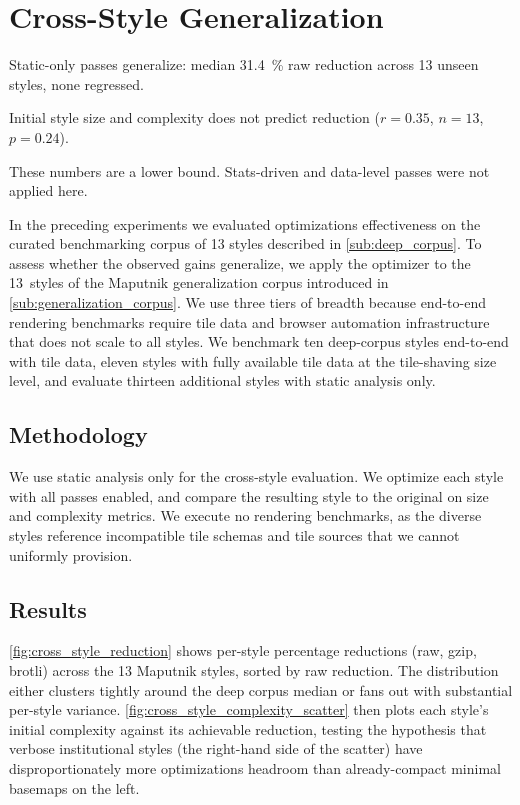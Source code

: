 \section{Cross-Style Generalization}\label{sec:exp_cross_style}
\begin{keytakeaways}
\item Static-only passes generalize: median \qty{31.4}{\percent} raw reduction across 13 unseen styles, none regressed.
\item Initial style size and complexity does not predict reduction ($r = 0.35$, $n = 13$, $p = 0.24$).
\item These numbers are a lower bound.
Stats-driven and data-level passes were not applied here.
\end{keytakeaways}

\noindent In the preceding experiments we evaluated optimizations effectiveness on the curated benchmarking corpus of 13 styles described in \cref{sub:deep_corpus}.
To assess whether the observed gains generalize, we apply the optimizer to the 13~styles of the Maputnik generalization corpus introduced in \cref{sub:generalization_corpus}.
We use three tiers of breadth because end-to-end rendering benchmarks require tile data and browser automation infrastructure that does not scale to all styles.
We benchmark ten deep-corpus styles end-to-end with tile data, eleven styles with fully available tile data at the tile-shaving size level, and evaluate thirteen additional styles with static analysis only.

\subsection{Methodology}\label{sub:cross_methodology}

We use static analysis only for the cross-style evaluation.
We optimize each style with all passes enabled, and compare the resulting style to the original on size and complexity metrics.
We execute no rendering benchmarks, as the diverse styles reference incompatible tile schemas and tile sources that we cannot uniformly provision.

\subsection{Results}\label{sub:cross_results}

\cref{fig:cross_style_reduction} shows per-style percentage reductions (raw, gzip, brotli) across the 13 Maputnik styles, sorted by raw reduction.
The distribution either clusters tightly around the deep corpus median or fans out with substantial per-style variance.
\cref{fig:cross_style_complexity_scatter} then plots each style's initial complexity against its achievable reduction, testing the hypothesis that verbose institutional styles (the right-hand side of the scatter) have disproportionately more optimizations headroom than already-compact minimal basemaps on the left.

